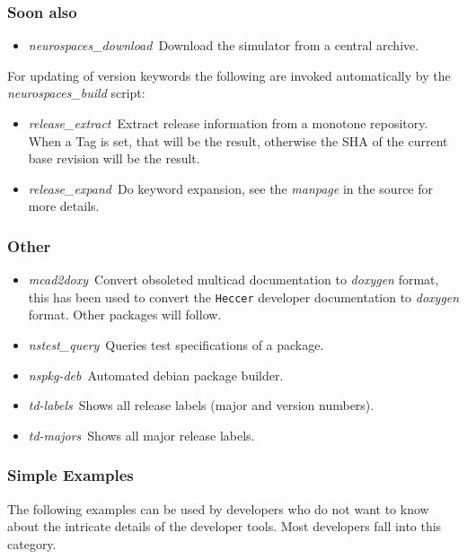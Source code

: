 \documentclass[12pt]{article}
\begin{document}
\subsubsection*{Soon also}

\begin{itemize}
	\item {\it neurospaces\_download}\,\,\,Download the simulator from a central archive.
\end{itemize}
For updating of version keywords the following are invoked automatically by the {\it neurospaces\_build} script:
\begin{itemize}
	\item {\it release\_extract}\,\,\,Extract release information from a monotone repository. When a Tag is set, that will be the result, otherwise the SHA of the current base revision will be the result.
	\item {\it release\_expand}\,\,\,Do keyword expansion, see the {\it manpage} in the source for more details. 
\end{itemize}

\subsubsection*{Other}

\begin{itemize}
\item {\it mcad2doxy}\,\,\,Convert obsoleted multicad documentation to
  {\it doxygen} format, this has been used to convert the {\tt Heccer}
  developer documentation to {\it doxygen} format. Other packages will
  follow.
\item {\it nstest\_query}\,\,\,Queries test specifications of a package.
\item {\it nspkg-deb}\,\,\,Automated debian package builder.
\item {\it td-labels}\,\,\,Shows all release labels (major and version numbers).
\item {\it td-majors}\,\,\,Shows all major release labels.
\end{itemize}

\subsubsection*{Simple Examples}

The following examples can be used by developers who do not want to
know about the intricate details of the developer tools.  Most
developers fall into this category.
\end{document}
